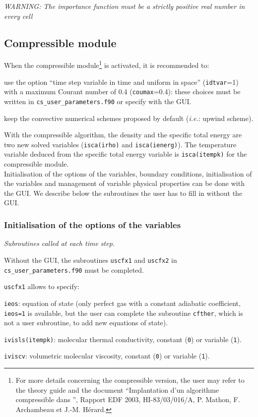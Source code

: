 {{\noindent
\emph{WARNING: The importance function must be a strictly positive real
number in every cell}

\subsection{Compressible module}

When the compressible module\footnote{For more details concerning the
compressible version, the user may refer to the theory guide \cite{theory} and the document ``Implantation
d'un algorithme compressible dans \CS'', Rapport EDF 2003,
HI-83/03/016/A, P. Mathon, F. Archambeau et J.-M. H\'erard.} is
activated, it is recommended to:
\begin{list}{-}{}
 \item use the option ``time step variable in time and uniform in
       space'' (\texttt{idtvar}=1) with a maximum Courant number of 0.4
       (\texttt{coumax}=0.4): these choices must be written in \texttt{cs\_user\_parameters.f90}
       or specify with the GUI.
 \item keep the convective numerical schemes proposed by default (\textit{i.e.}: upwind scheme).
\end{list}
With the compressible algorithm, the density and the specific total energy are two new solved variables
(\texttt{isca(irho)} and \texttt{isca(ienerg)}). The temperature variable deduced from the specific
total energy variable is \texttt{isca(itempk)} for the compressible module.\\
Initialisation of the options of the variables, boundary conditions, initialisation of the variables and
management of variable physical properties can be done with the GUI. We describe below the subroutines
the user has to fill in without the GUI.

\subsubsection{ Initialisation of the options of the variables}
\label{prg_uscfx12}%
\noindent
\textit{Subroutines called at each time step.}

Without the GUI, the subroutines \texttt{uscfx1} and \texttt{uscfx2} in \texttt{cs\_user\_parameters.f90}
must be completed.

\texttt{uscfx1} allows to specify:
\begin{list}{-}{}
\item \texttt{ieos}: equation of state (only perfect gas with a constant adiabatic coefficient,
                      \texttt{ieos=1} is available, but the user can complete the subroutine
                      \texttt{cfther}, which is not a user subroutine, to add new equations of state).
\item \texttt{ivisls(itempk)}: molecular thermal conductivity, constant (\texttt{0}) or variable (\texttt{1}).
\item  \texttt{iviscv}: volumetric molecular viscosity, constant (\texttt{0}) or variable (\texttt{1}).
\end{list}

}}
